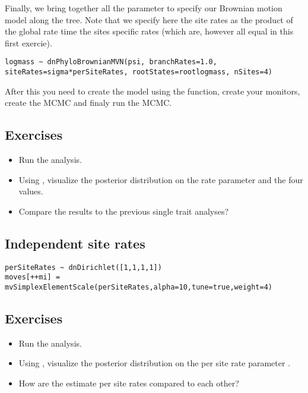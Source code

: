 Finally, we bring together all the parameter to specify our Brownian motion model along the tree. Note that we specify here the site rates as the product of the global rate  time the sites specific rates (which are, however all equal in this first exercie).
{\tt \small \begin{snugshade*}
\begin{lstlisting}
logmass ~ dnPhyloBrownianMVN(psi, branchRates=1.0, siteRates=sigma*perSiteRates, rootStates=rootlogmass, nSites=4)
\end{lstlisting}
\end{snugshade*}}

After this you need to create the model using the  function, create your monitors, create the MCMC and finaly run the MCMC.


\subsection*{Exercises}

\begin{itemize}
\item
Run the analysis.
\item
Using , visualize the posterior distribution on the rate parameter  and the four  values.
\item 
Compare the results to the previous single trait analyses?
\end{itemize}

\vspace{5cm}



\subsection{Independent site rates}

{\tt \small \begin{snugshade*}
\begin{lstlisting}
perSiteRates ~ dnDirichlet([1,1,1,1])
moves[++mi] = mvSimplexElementScale(perSiteRates,alpha=10,tune=true,weight=4)
\end{lstlisting}
\end{snugshade*}}


\subsection*{Exercises}

\begin{itemize}
\item
Run the analysis.
\item
Using , visualize the posterior distribution on the per site rate parameter .
\item 
How are the estimate per site rates compared to each other?
\end{itemize}

